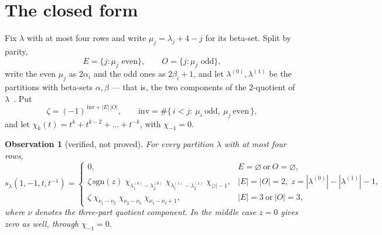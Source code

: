 \documentclass[11pt,a4paper]{article}
\newtheorem{observation}{Observation}
\begin{document}
\section{The closed form}\label{sec:closedform}

Fix $\lambda$ with at most four rows and write $\mu_j=\lambda_j+4-j$ for its beta-set. Split
by parity,
\[
E=\{j:\mu_j \text{ even}\},\qquad O=\{j:\mu_j\text{ odd}\},
\]
write the even $\mu_j$ as $2\alpha_i$ and the odd ones as $2\beta_i+1$, and let
$\lambda^{(0)},\lambda^{(1)}$ be the partitions with beta-sets $\alpha,\beta$ --- that is, the
two components of the $2$-quotient of $\lambda$~\cite[Ch.~I, Ex.~1.8]{Macdonald}. Put
\begin{equation}\label{eq:sign}
\zeta=(-1)^{\,\mathrm{inv}+|E|\,|O|},\qquad
\mathrm{inv}=\#\{\,i<j:\ \mu_i\ \text{odd},\ \mu_j\ \text{even}\,\},
\end{equation}
and let $\chi_k(t)=t^k+t^{k-2}+\dots+t^{-k}$, with $\chi_{-1}=0$.

\begin{observation}[verified, not proved]\label{obs:main}
For every partition $\lambda$ with at most four rows,
\begin{equation}\label{eq:closedform}
\boxed{
s_\lambda(1,-1,t,t^{-1})=
\begin{cases}
0, & E=\varnothing\ \text{or}\ O=\varnothing,\\[3pt]
\zeta\,\mathrm{sgn}(z)\;
\chi_{\lambda^{(0)}_1-\lambda^{(0)}_2}\;
\chi_{\lambda^{(1)}_1-\lambda^{(1)}_2}\;
\chi_{|z|-1},
& |E|=|O|=2,\; z=|\lambda^{(0)}|-|\lambda^{(1)}|-1,\\[3pt]
\zeta\;\chi_{\nu_1-\nu_2}\;\chi_{\nu_2-\nu_3}\;\chi_{\nu_1-\nu_3+1},
& |E|=3\ \text{or}\ |O|=3,
\end{cases}}
\end{equation}
where $\nu$ denotes the three-part quotient component. In the middle case $z=0$ gives zero as
well, through $\chi_{-1}=0$.
\end{observation}
\end{document}

